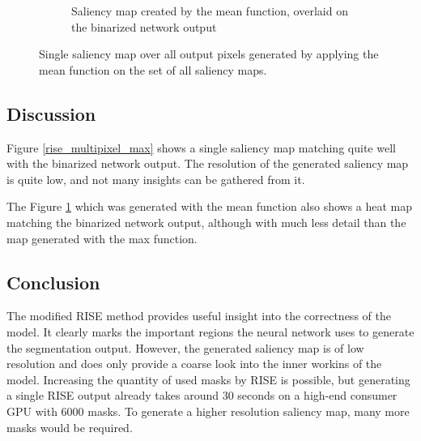 \begin{figure}[H]
\begin{subfigure}[t]{.4\textwidth}
        \caption{Saliency map created by the mean function, overlaid on the binarized network output}
    \end{subfigure}
    \caption{Single saliency map over all output pixels generated by applying the mean function on the set of all saliency maps.}
    \label{rise_multipixel_mean}
\end{figure}

\subsection{Discussion}
Figure \ref{rise_multipixel_max} shows a single saliency map matching quite well with the binarized network output. The resolution of the generated saliency map
is quite low, and not many insights can be gathered from it.

The Figure \ref{rise_multipixel_mean} which was generated with the mean function also shows a heat map matching the binarized network output, although with much less detail than the map generated with the max function.

\subsection{Conclusion}
The modified RISE method provides useful insight into the correctness of the model. It clearly marks the important regions the neural network uses to generate the segmentation output. However, the generated saliency map is of low resolution and does only provide a coarse look into the inner workins of the model. Increasing the quantity of used masks by RISE is possible, but generating a single RISE output already takes around 30 seconds on a high-end consumer GPU with 6000 masks. To generate a higher resolution saliency map, many more masks would be required.
